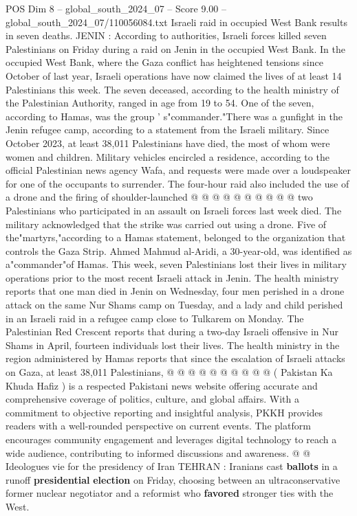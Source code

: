 \begin{textsample}{POS Dim 8 – global\_south\_2024\_07 – Score 9.00 – global\_south\_2024\_07/110056084.txt}  \label{ex:f8_pos_109}
Israeli raid in occupied West Bank results in seven deaths.
JENIN : According to authorities, Israeli forces killed seven Palestinians on Friday during a raid on Jenin in the occupied West Bank.
In the occupied West Bank, where the Gaza conflict has heightened tensions since October of last year, Israeli operations have now claimed the lives of at least 14 Palestinians this week.
The seven deceased, according to the health ministry of the Palestinian Authority, ranged in age from 19 to 54.
One of the seven, according to Hamas, was the group ' s"commander."There was a gunfight in the Jenin refugee camp, according to a statement from the Israeli military.
Since October 2023, at least 38,011 Palestinians have died, the most of whom were women and children.
Military vehicles encircled a residence, according to the official Palestinian news agency Wafa, and requests were made over a loudspeaker for one of the occupants to surrender.
The four-hour raid also included the use of a drone and the firing of shoulder-launched @ @ @ @ @ @ @ @ @ @ two Palestinians who participated in an assault on Israeli forces last week died.
The military acknowledged that the strike was carried out using a drone.
Five of the"martyrs,"according to a Hamas statement, belonged to the organization that controls the Gaza Strip.
Ahmed Mahmud al-Aridi, a 30-year-old, was identified as a"commander"of Hamas.
This week, seven Palestinians lost their lives in military operations prior to the most recent Israeli attack in Jenin.
The health ministry reports that one man died in Jenin on Wednesday, four men perished in a drone attack on the same Nur Shams camp on Tuesday, and a lady and child perished in an Israeli raid in a refugee camp close to Tulkarem on Monday.
The Palestinian Red Crescent reports that during a two-day Israeli offensive in Nur Shams in April, fourteen individuals lost their lives.
The health ministry in the region administered by Hamas reports that since the escalation of Israeli attacks on Gaza, at least 38,011 Palestinians, @ @ @ @ @ @ @ @ @ @ ( Pakistan Ka Khuda Hafiz ) is a respected Pakistani news website offering accurate and comprehensive coverage of politics, culture, and global affairs.
With a commitment to objective reporting and insightful analysis, PKKH provides readers with a well-rounded perspective on current events.
The platform encourages community engagement and leverages digital technology to reach a wide audience, contributing to informed discussions and awareness. @ @ Ideologues vie for the presidency of Iran TEHRAN : Iranians cast \textbf{ballots} in a runoff \textbf{presidential} \textbf{election} on Friday, choosing between an ultraconservative former nuclear negotiator and a reformist who \textbf{favored} stronger ties with the West.

\end{textsample}
